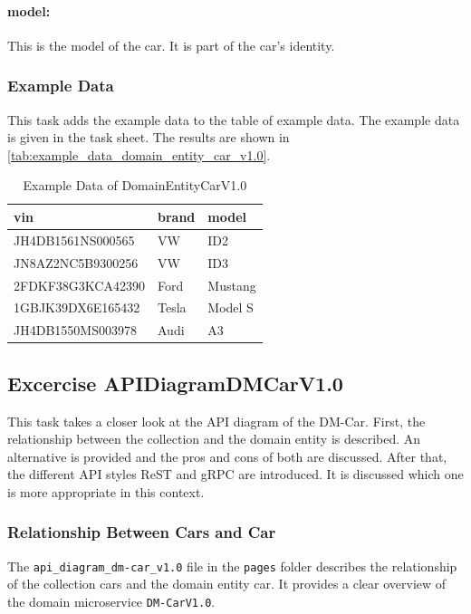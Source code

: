 \paragraph*{model:}
This is the model of the car.
It is part of the car's identity.

\subsubsection*{Example Data}
This task adds the example data to the table of example data.
The example data is given in the task sheet.
The results are shown in \autoref{tab:example_data_domain_entity_car_v1.0}.
\begin{table}
    \centering
    \caption{Example Data of DomainEntityCarV1.0}
    \label{tab:example_data_domain_entity_car_v1.0}
    \begin{tabular}{|p{5cm}|p{2cm}|p{2cm}|}
        \hline
        vin & brand & model \\
        \hline
        JH4DB1561NS000565 & VW & ID2 \\
        JN8AZ2NC5B9300256 & VW & ID3 \\
        2FDKF38G3KCA42390 & Ford & Mustang \\
        1GBJK39DX6E165432 & Tesla & Model S \\
        JH4DB1550MS003978 & Audi & A3 \\
        \hline
    \end{tabular}
\end{table}

\subsection{Excercise APIDiagramDMCarV1.0}
\label{subsec:api_diagram_dm_car_v1.0}
This task takes a closer look at the API diagram of the DM-Car.
First, the relationship between the collection and the domain entity is described.
An alternative is provided and the pros and cons of both are discussed.
After that, the different API styles ReST and gRPC are introduced.
It is discussed which one is more appropriate in this context.
\subsubsection*{Relationship Between Cars and Car}
The \texttt{api\_diagram\_dm-car\_v1.0} file in the \texttt{pages} folder describes the relationship of the collection cars and the domain entity car.
It provides a clear overview of the domain microservice \texttt{DM-CarV1.0}.


